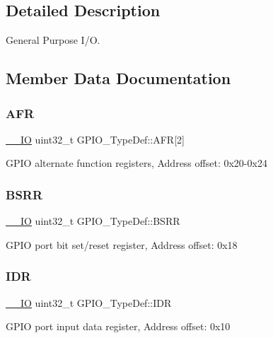 \subsection{Detailed Description}
General Purpose I/O. 

\subsection{Member Data Documentation}
\mbox{\label{struct_g_p_i_o___type_def_a2245603433e102f0fd8a85f7de020755}} 
\subsubsection{\texorpdfstring{AFR}{AFR}}
{\footnotesize\ttfamily \mbox{\hyperlink{core__sc300_8h_aec43007d9998a0a0e01faede4133d6be}{\+\_\+\+\_\+\+IO}} uint32\+\_\+t G\+P\+I\+O\+\_\+\+Type\+Def\+::\+A\+FR\mbox{[}2\mbox{]}}

G\+P\+IO alternate function registers, Address offset\+: 0x20-\/0x24 \mbox{\label{struct_g_p_i_o___type_def_acd6f21e08912b484c030ca8b18e11cd6}} 
\subsubsection{\texorpdfstring{BSRR}{BSRR}}
{\footnotesize\ttfamily \mbox{\hyperlink{core__sc300_8h_aec43007d9998a0a0e01faede4133d6be}{\+\_\+\+\_\+\+IO}} uint32\+\_\+t G\+P\+I\+O\+\_\+\+Type\+Def\+::\+B\+S\+RR}

G\+P\+IO port bit set/reset register, Address offset\+: 0x18 \mbox{\label{struct_g_p_i_o___type_def_acf11156409414ad8841bb0b62959ee96}} 
\subsubsection{\texorpdfstring{IDR}{IDR}}
{\footnotesize\ttfamily \mbox{\hyperlink{core__sc300_8h_aec43007d9998a0a0e01faede4133d6be}{\+\_\+\+\_\+\+IO}} uint32\+\_\+t G\+P\+I\+O\+\_\+\+Type\+Def\+::\+I\+DR}

G\+P\+IO port input data register, Address offset\+: 0x10 \mbox{\label{struct_g_p_i_o___type_def_a95a59d4b1d52be521f3246028be32f3e}} 
